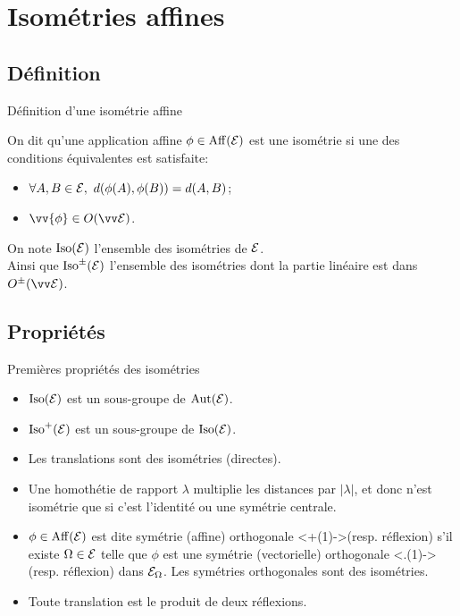 \documentclass[bigger]{m53beamer}
\begin{document}
\section{Isométries affines}

\subsection{Définition}
\begin{frame}{Définition d'une isométrie affine}
  \begin{defprop}
    On dit qu'une application affine $\phi \in\operatorname{Aff}(\mathcal{E})$ est une \alert{isométrie} si une des conditions équivalentes est satisfaite:
    \begin{itemize}[<+(1)->]
      \item $\forall A,B \in \ens{E},\ d(\phi(A),\phi(B)) = d(A,B)$;
      \item $\vv{\phi} \in O(\ev{E})$.
    \end{itemize}
  \end{defprop}\pause
  On note \alert{$\operatorname{Iso}(\mathcal{E})$} l'ensemble des isométries de $\mathcal{E}$.\pause\\
  Ainsi que \alert{$\operatorname{Iso}^{\pm}(\mathcal{E})$} l'ensemble des isométries dont la partie linéaire est dans $O^{\pm}(\ev{E})$.
\end{frame}

\subsection{Propriétés}
\begin{frame}{Premières propriétés des isométries}
  \begin{itemize}[<+(1)->]
    \item $\operatorname{Iso}(\mathcal{E})$ est un sous-groupe de $\operatorname{Aut}(\mathcal{E})$.
    \item $\operatorname{Iso}^{+}(\mathcal{E})$ est un sous-groupe de $\operatorname{Iso}(\mathcal{E})$.
    \item Les translations sont des isométries (directes).
    \item Une homothétie de rapport $\lambda$ multiplie les distances par $|\lambda|$\pause ,
      et donc n'est isométrie que si c'est l'identité ou une symétrie centrale.
    \item $\phi \in\operatorname{Aff}(\mathcal{E})$ est dite \alert{symétrie (affine) orthogonale} \uncover<+(1)->{(resp. \alert{réflexion})} s'il existe $\Omega \in \mathcal{E}$ telle que $\phi$ est une symétrie (vectorielle) orthogonale \uncover<.(1)->{(resp. réflexion)} dans $\mathcal{E}_{\Omega}$. \pause Les symétries orthogonales sont des isométries.
    \item Toute translation est le produit de deux réflexions.
  \end{itemize}
\end{frame}
\end{document}
